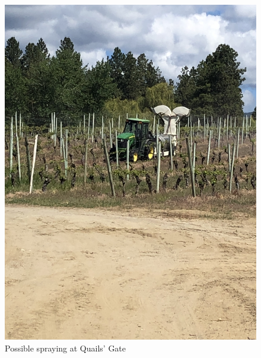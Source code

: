 \documentclass[11pt,letter]{article}
\newenvironment{smitemize}{
\begin{itemize}
  \setlength{\itemsep}{0pt}
  \setlength{\parskip}{0.8pt}
  \setlength{\parsep}{0pt}}
{\end{itemize}
}
\begin{document}
\begin{smitemize}
\end{smitemize}

\begin{figure} [H]
  \includegraphics[scale = .075, angle = 270]{qgMaybeSpray.jpeg}
  \caption{Possible spraying at Quails' Gate }
  \label{fig:qgMaybeSpray}
\end{figure}
\end{document}
